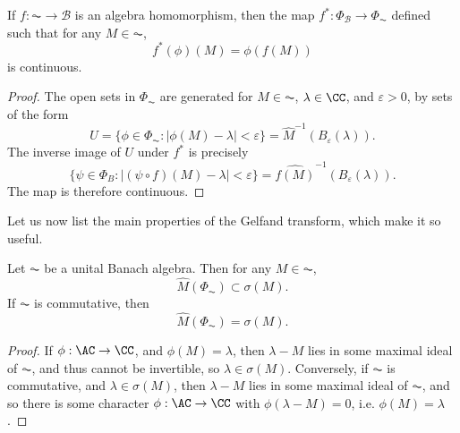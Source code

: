 \begin{theorem}
    If $f: \AC \to \mathcal{B}$ is an algebra homomorphism, then the map $f^*: \Phi_\mathcal{B} \to \Phi_{\AC}$ defined such that for any $M \in \AC$,
    \[ f^*(\phi)(M) = \phi(f(M)) \]
    is continuous.
\end{theorem}
\begin{proof}
    The open sets in $\Phi_{\AC}$ are generated for $M \in \AC$, $\lambda \in \CC$, and $\varepsilon > 0$, by sets of the form
    \[ U = \{ \phi \in \Phi_{\AC}: |\phi(M) - \lambda| < \varepsilon \} = \widehat{M}^{-1} \left( B_\varepsilon(\lambda) \right). \]
    The inverse image of $U$ under $f^*$ is precisely
    \[ \{ \psi \in \Phi_B : |(\psi \circ f)(M) - \lambda| < \varepsilon \} = \widehat{f(M)}^{-1} \left( B_\varepsilon(\lambda) \right). \]
    The map is therefore continuous.
\end{proof}

Let us now list the main properties of the Gelfand transform, which make it so useful.

\begin{theorem}
    Let $\AC$ be a unital Banach algebra. Then for any $M \in \AC$,
    \[ \widehat{M}(\Phi_{\AC}) \subset \sigma(M). \]
    If $\AC$ is commutative, then
    \[ \widehat{M}(\Phi_{\AC}) = \sigma(M). \]
\end{theorem}
\begin{proof}
    If $\phi: \AC \to \CC$, and $\phi(M) = \lambda$, then $\lambda - M$ lies in some maximal ideal of $\AC$, and thus cannot be invertible, so $\lambda \in \sigma(M)$. Conversely, if $\AC$ is commutative, and $\lambda \in \sigma(M)$, then $\lambda - M$ lies in some maximal ideal of $\AC$, and so there is some character $\phi: \AC \to \CC$ with $\phi(\lambda - M) = 0$, i.e. $\phi(M) = \lambda$.
\end{proof}

